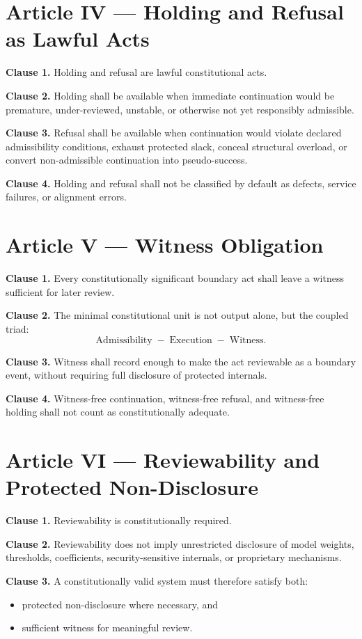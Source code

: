 \documentclass[11pt]{article}
\begin{document}
\section*{Article IV --- Holding and Refusal as Lawful Acts}

\textbf{Clause 1.} Holding and refusal are lawful constitutional acts.

\textbf{Clause 2.} Holding shall be available when immediate continuation would be premature, under-reviewed, unstable, or otherwise not yet responsibly admissible.

\textbf{Clause 3.} Refusal shall be available when continuation would violate declared admissibility conditions, exhaust protected slack, conceal structural overload, or convert non-admissible continuation into pseudo-success.

\textbf{Clause 4.} Holding and refusal shall not be classified by default as defects, service failures, or alignment errors.

\section*{Article V --- Witness Obligation}

\textbf{Clause 1.} Every constitutionally significant boundary act shall leave a witness sufficient for later review.

\textbf{Clause 2.} The minimal constitutional unit is not output alone, but the coupled triad:
\[
\text{Admissibility} \;-\; \text{Execution} \;-\; \text{Witness}.
\]

\textbf{Clause 3.} Witness shall record enough to make the act reviewable as a boundary event, without requiring full disclosure of protected internals.

\textbf{Clause 4.} Witness-free continuation, witness-free refusal, and witness-free holding shall not count as constitutionally adequate.

\section*{Article VI --- Reviewability and Protected Non-Disclosure}

\textbf{Clause 1.} Reviewability is constitutionally required.

\textbf{Clause 2.} Reviewability does not imply unrestricted disclosure of model weights, thresholds, coefficients, security-sensitive internals, or proprietary mechanisms.

\textbf{Clause 3.} A constitutionally valid system must therefore satisfy both:
\begin{itemize}[leftmargin=2em]
    \item protected non-disclosure where necessary, and
    \item sufficient witness for meaningful review.
\end{itemize}
\end{document}
